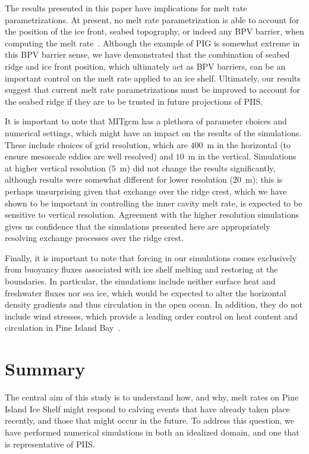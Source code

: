 \documentclass[draft]{agujournal2019}
\begin{document}
The results presented in this paper have implications for melt rate parametrizations. At present, no melt rate parametrization is able to account for the position of the ice front, seabed topography, or indeed any BPV barrier, when computing the melt rate~\cite{AsayDavis2017CurrClimChRep, Reese2018Cryo, Bradley2022}. Although the example of PIG is somewhat extreme in this BPV barrier sense, we have demonstrated that the combination of seabed ridge and ice front position, which ultimately act as BPV barriers, can be an important control on the melt rate applied to an ice shelf. Ultimately, our results suggest that current melt rate parametrizations must be improved to account for the seabed ridge if they are to be trusted in future projections of PIIS.

It is important to note that MITgcm has a plethora of parameter choices and numerical settings, which might have an impact on the results of the simulations. These include choices of grid resolution, which are $400$~m in the horizontal (to ensure mesoscale eddies are well resolved) and $10$~m in the vertical. Simulations at higher vertical resolution ($5$~m) did not change the results significantly, although results were somewhat different for lower resolution ($20$~m); this is perhaps unsurprising given that exchange over the ridge crest, which we have shown to be important in controlling the inner cavity melt rate, is expected to be sensitive to vertical resolution. Agreement with the higher resolution simulations gives us confidence that the simulations presented here are appropriately resolving exchange processes over the ridge crest.

Finally, it is important to note that forcing in our simulations comes exclusively from buoyancy fluxes associated with ice shelf melting and restoring at the boundaries. In particular, the simulations include neither surface heat and freshwater fluxes nor sea ice, which would be expected to alter the horizontal density gradients and thus circulation in the open ocean. In addition, they do not include wind stresses, which provide a leading order control on heat content and circulation in Pine Island Bay~\cite{Dutrieux2014Science}.

\section{Summary}\label{S:Summary}
The central aim of this study is to understand how, and why, melt rates on Pine Island Ice Shelf might respond to calving events that have already taken place recently, and those that might occur in the future. To address this question, we have performed numerical simulations in both an idealized domain, and one that is representative of PIIS.
\end{document}
